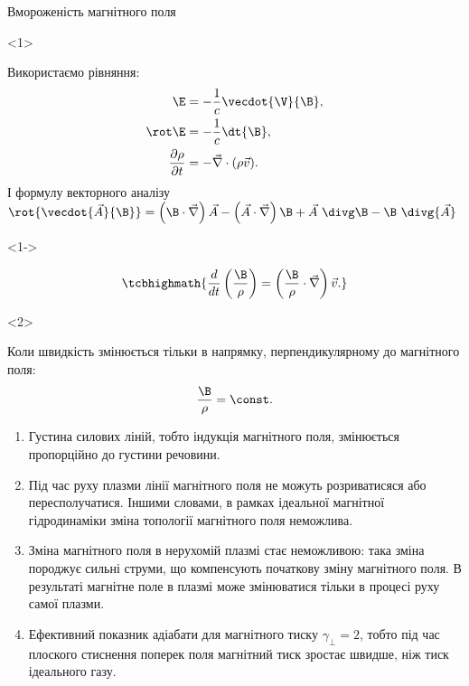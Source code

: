 \documentclass[]{beamer}
\begin{document}
\begin{frame}{Вмороженість магнітного поля}{}
	\begin{onlyenv}
		\begin{block}{}
			Використаємо рівняння:
			\begin{align*}
				\E                               & = -\frac1c \vecdot{\V}{\B}, \\
				\rot\E                           & = -\frac1c \dt{\B},                 \\
				\frac{\partial \rho}{\partial t} & = - \vec\nabla\cdot(\rho\vec{v}).
			\end{align*}
			І формулу векторного аналізу \(\rot{\vecdot{\vec{A}}{\B}} = \left( \B\cdot\vec{\nabla}\right)\vec{A} - \left( \vec{A}\cdot\vec{\nabla}\right)\B + 	\vec{A}\  \divg\B - \B\ \divg{\vec{A}} \)
		\end{block}
	\end{onlyenv}

	\begin{onlyenv}<1->
		\begin{block}{}
			\begin{equation*}
				\tcbhighmath{
					\frac{d}{dt}\left(\frac{\B}{\rho}\right) = \left(\frac{\B}{\rho}\cdot\vec{\nabla}\right)\vec{v}.
				}
			\end{equation*}
		\end{block}
	\end{onlyenv}

	\begin{onlyenv}
		\begin{block}{}
			Коли швидкість змінюється тільки \alert{в напрямку, перпендикулярному
				до магнітного поля:}
			\begin{equation*}
				\frac{\B}{\rho} = \const.
			\end{equation*}
			\begin{enumerate}\scriptsize
				\item Густина силових ліній, тобто індукція магнітного поля, змінюється пропорційно до  густини речовини.
				\item Під час руху плазми лінії магнітного поля не можуть розриватисяся або пересполучатися. Іншими словами, в рамках ідеальної магнітної гідродинаміки зміна топології магнітного поля неможлива.
				\item Зміна магнітного поля в нерухомій плазмі стає неможливою: така зміна породжує сильні струми, що компенсують початкову зміну магнітного поля. В результаті магнітне поле в плазмі може змінюватися тільки в процесі руху самої плазми.
				\item Ефективний показник адіабати для магнітного тиску $\gamma_{\perp} = 2$, тобто під час плоского стиснення поперек поля магнітний тиск зростає швидше, ніж тиск ідеального газу.
			\end{enumerate}
		\end{block}
	\end{onlyenv}


\end{frame}
\end{document}

